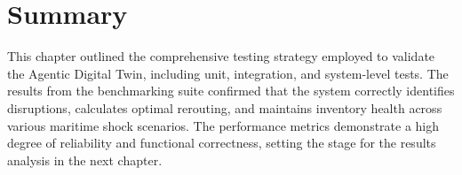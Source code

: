 \section[Summary]{Summary}
This chapter outlined the comprehensive testing strategy employed to validate the Agentic Digital Twin, including unit, integration, and system-level tests. The results from the benchmarking suite confirmed that the system correctly identifies disruptions, calculates optimal rerouting, and maintains inventory health across various maritime shock scenarios. The performance metrics demonstrate a high degree of reliability and functional correctness, setting the stage for the results analysis in the next chapter.


